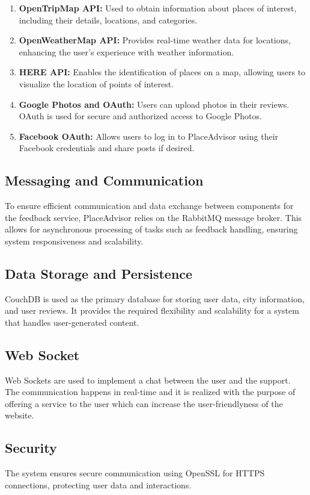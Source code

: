 \documentclass[../main.tex]{subfiles}
\begin{document}
\begin{enumerate}
    \item \textbf{OpenTripMap API:} Used to obtain information about places of interest, including their details, locations, and categories.
    
    \item \textbf{OpenWeatherMap API:} Provides real-time weather data for locations, enhancing the user's experience with weather information.
    
    \item \textbf{HERE API:} Enables the identification of places on a map, allowing users to visualize the location of points of interest.
    
    \item \textbf{Google Photos and OAuth:} Users can upload photos in their reviews. OAuth is used for secure and authorized access to Google Photos.
    
    \item \textbf{Facebook OAuth:} Allows users to log in to PlaceAdvisor using their Facebook credentials and share posts if desired.
\end{enumerate}

\subsection{Messaging and Communication}

To ensure efficient communication and data exchange between components for the feedback service, PlaceAdvisor relies on the RabbitMQ message broker. This allows for asynchronous processing of tasks such as feedback handling, ensuring system responsiveness and scalability.


\subsection{Data Storage and Persistence}

CouchDB is used as the primary database for storing user data, city information, and user reviews. It provides the required flexibility and scalability for a system that handles user-generated content.

\subsection{Web Socket}

Web Sockets are used to implement a chat between the user and the support. The communication happens in real-time and it is realized with the purpose of offering a service to the user which can increase the user-friendlyness of the website.

\subsection{Security}

The system ensures secure communication using OpenSSL for HTTPS connections, protecting user data and interactions.
\end{document}
